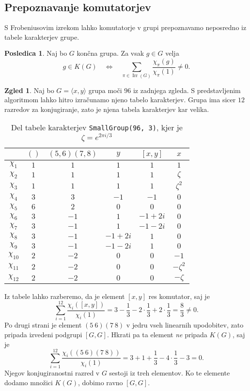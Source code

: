 \documentclass[11pt]{book}
\DeclareMathOperator\Irr{Irr}
\theoremstyle{definition}
\theoremstyle{zgled}
\newtheorem*{zgled}{Zgled}
\theoremstyle{odprtproblem}
\theoremstyle{domacanaloga}
\theoremstyle{izrek}
\newtheorem*{posledica}{Posledica}
\begin{document}
\subsection{Prepoznavanje komutatorjev}

S Frobeniusovim izrekom lahko komutatorje v grupi prepoznavamo neposredno iz tabele karakterjev grupe.

\begin{posledica}
Naj bo $G$ končna grupa. Za vsak $g \in G$ velja
\[
    g \in K(G) \quad \Longleftrightarrow \quad \sum_{\pi \in \Irr(G)} \frac{\chi_{\pi}(g)}{\chi_{\pi}(1)} \neq 0.
\]
\end{posledica}

\begin{zgled}
Naj bo $G = \langle x, y \rangle$ grupa moči $96$ iz zadnjega zgleda. S predstavljenim algoritmom lahko hitro izračunamo njeno tabelo karakterjev. Grupa ima sicer $12$ razredov za konjugiranje, zato je njena tabela karakterjev kar velika. 

\begin{table}[t]
    \centering
\begin{tabular}{c|*{5}{c}}
    & $()$ & $(5,6)(7,8)$ & $y$ & $[x,y]$ & $x$\\ \hline 
    $\chi_{1}$ & $1$ & $1$ & $1$ & $1$ & $1$\\ 
    $\chi_{2}$ & $1$ & $1$ & $1$ & $1$ & $\zeta$\\ 
    $\chi_{3}$ & $1$ & $1$ & $1$ & $1$ & $\zeta^2$\\ 
    $\chi_{4}$ & $3$ & $3$ & $-1$ & $-1$ & $0$\\ 
    $\chi_{5}$ & $6$ & $2$ & $0$ & $0$ & $0$\\ 
    $\chi_{6}$ & $3$ & $-1$ & $1$ & $-1+2i$ & $0$\\ 
    $\chi_{7}$ & $3$ & $-1$ & $1$ & $-1-2i$ & $0$\\ 
    $\chi_{8}$ & $3$ & $-1$ & $-1+2i$ & $1$ & $0$\\ 
    $\chi_{9}$ & $3$ & $-1$ & $-1-2i$ & $1$ & $0$\\ 
    $\chi_{10}$ & $2$ & $-2$ & $0$ & $0$ & $-1$\\ 
    $\chi_{11}$ & $2$ & $-2$ & $0$ & $0$ & $-\zeta^2$\\ 
    $\chi_{12}$ & $2$ & $-2$ & $0$ & $0$ & $-\zeta$\\
\end{tabular}
\caption{Del tabele karakterjev \texttt{SmallGroup(96, 3)}, kjer je $\zeta = e^{2 \pi i / 3}$}
\end{table}

Iz tabele lahko razberemo, da je element $[x,y]$ res komutator, saj je 
\[
    \sum_{i = 1}^{12} \frac{\chi_i([x,y])}{\chi_i(1)} = 
    3 - \frac13 - 2 \cdot \frac13 + 2 \cdot \frac13 = 
    \frac83 \neq 0.
\]
Po drugi strani je element $(5 \ 6)(7 \ 8)$ v jedru vseh linearnih upodobitev, zato pripada izvedeni podgrupi $[G,G]$. Hkrati pa ta element \emph{ne} pripada $K(G)$, saj je 
\[
    \sum_{i = 1}^{12} \frac{\chi_i((5 \ 6)(7 \ 8))}{\chi_i(1)} =
    3 + 1 + \frac13 - 4 \cdot \frac13 - 3 = 0.
\]
Njegov konjugiranostni razred v $G$ sestoji iz treh elementov. Ko te elemente dodamo množici $K(G)$, dobimo ravno $[G,G]$.
\end{zgled}
\end{document}
